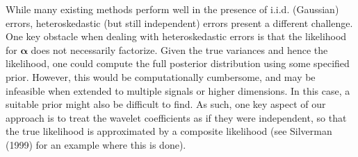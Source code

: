 \documentclass[12pt]{article}
\newcommand{\Ga}{\alpha}
\begin{document}
While many existing methods perform well in the presence of i.i.d. (Gaussian) errors, heteroskedastic (but still independent) errors present a different challenge. One key obstacle when dealing with heteroskedastic errors is that the likelihood for $\bm{\Ga}$ does not necessarily factorize. Given the true variances and hence the likelihood, one could compute the full posterior distribution using some specified prior. However, this would be computationally cumbersome, and may be infeasible when extended to multiple signals or higher dimensions. In this case, a suitable prior might also be difficult to find. As such, one key aspect of our approach is to treat the wavelet coefficients as if they were independent, so that the true likelihood is approximated by a composite likelihood (see Silverman (1999) for an example where this is done).
\end{document}
